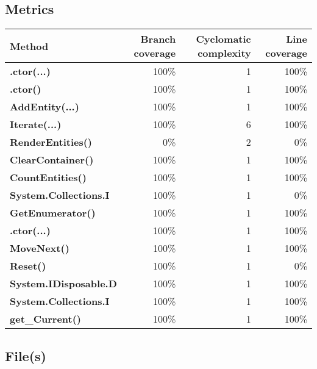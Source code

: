 \documentclass[a4paper,landscape,10pt]{article}
\begin{document}
\subsection{Metrics}
\begin{longtable}[l]{|l|r|r|r|}
\hline
\textbf{Method} & \textbf{Branch coverage} & \textbf{Cyclomatic complexity} & \textbf{Line coverage}\\
\hline
\textbf{.ctor(...)} & 100\% & 1 & 100\%\\
\hline
\textbf{.ctor()} & 100\% & 1 & 100\%\\
\hline
\textbf{AddEntity(...)} & 100\% & 1 & 100\%\\
\hline
\textbf{Iterate(...)} & 100\% & 6 & 100\%\\
\hline
\textbf{RenderEntities()} & 0\% & 2 & 0\%\\
\hline
\textbf{ClearContainer()} & 100\% & 1 & 100\%\\
\hline
\textbf{CountEntities()} & 100\% & 1 & 100\%\\
\hline
\textbf{System.Collections.I} & 100\% & 1 & 0\%\\
\hline
\textbf{GetEnumerator()} & 100\% & 1 & 100\%\\
\hline
\textbf{.ctor(...)} & 100\% & 1 & 100\%\\
\hline
\textbf{MoveNext()} & 100\% & 1 & 100\%\\
\hline
\textbf{Reset()} & 100\% & 1 & 0\%\\
\hline
\textbf{System.IDisposable.D} & 100\% & 1 & 100\%\\
\hline
\textbf{System.Collections.I} & 100\% & 1 & 100\%\\
\hline
\textbf{get\_Current()} & 100\% & 1 & 100\%\\
\hline
\end{longtable}
\subsection{File(s)}
\end{document}
